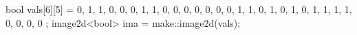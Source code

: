 bool vals[6][5] = {
  {0, 1, 1, 0, 0},
  {0, 1, 1, 0, 0},
  {0, 0, 0, 0, 0},
  {1, 1, 0, 1, 0},
  {1, 0, 1, 1, 1},
  {1, 0, 0, 0, 0}
};
image2d<bool> ima = make::image2d(vals);
